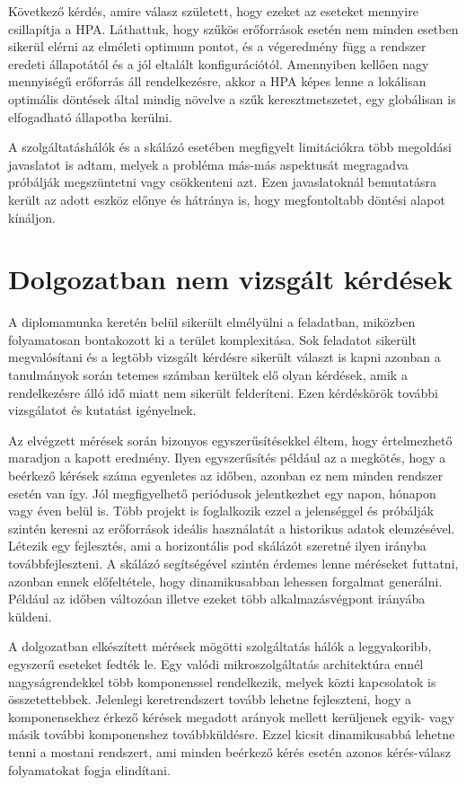 Következő kérdés, amire válasz született, hogy ezeket az eseteket mennyire csillapítja a HPA.
Láthattuk, hogy szűkös erőforrások esetén nem minden esetben sikerül elérni az elméleti optimum pontot, és a végeredmény függ a rendszer eredeti állapotától és a jól eltalált konfigurációtól.
Amennyiben kellően nagy mennyiségű erőforrás áll rendelkezésre, akkor a HPA képes lenne a lokálisan optimális döntések által mindig növelve a szűk keresztmetszetet, egy globálisan is elfogadható állapotba kerülni.

A szolgáltatáshálók és a skálázó esetében megfigyelt limitációkra több megoldási javaslatot is adtam, melyek a probléma más-más aspektusát megragadva próbálják megszüntetni vagy csökkenteni azt.
Ezen javaslatoknál bemutatásra került az adott eszköz előnye és hátránya is, hogy megfontoltabb döntési alapot kínáljon.

\section{Dolgozatban nem vizsgált kérdések}
A diplomamunka keretén belül sikerült elmélyülni a feladatban, miközben folyamatosan bontakozott ki a terület komplexitása.
Sok feladatot sikerült megvalósítani és a legtöbb vizsgált kérdésre sikerült választ is kapni azonban a tanulmányok során tetemes számban kerültek elő olyan kérdések, amik a rendelkezésre álló idő miatt nem sikerült felderíteni.
Ezen kérdéskörök további vizsgálatot és kutatást igényelnek.

Az elvégzett mérések során bizonyos egyszerűsítésekkel éltem, hogy értelmezhető maradjon a kapott eredmény.
Ilyen egyszerűsítés például az a megkötés, hogy a beérkező kérések száma egyenletes az időben, azonban ez nem minden rendszer esetén van így.
Jól megfigyelhető periódusok jelentkezhet egy napon, hónapon vagy éven belül is.
Több projekt is foglalkozik ezzel a jelenséggel és próbálják szintén keresni az erőforrások ideális használatát a historikus adatok elemzésével.
Létezik egy fejlesztés, ami a horizontális pod skálázót szeretné ilyen irányba továbbfejleszteni\citep{predictiveHPAGithub}.
A skálázó segítségével szintén érdemes lenne méréseket futtatni, azonban ennek előfeltétele, hogy dinamikusabban lehessen forgalmat generálni.
Például az időben változóan illetve ezeket több alkalmazásvégpont irányába küldeni.

A dolgozatban elkészített mérések mögötti szolgáltatás hálók a leggyakoribb, egyszerű eseteket fedték le.
Egy valódi mikroszolgáltatás architektúra ennél nagyságrendekkel több komponenssel rendelkezik, melyek közti kapcsolatok is összetettebbek.
Jelenlegi keretrendszert tovább lehetne fejleszteni, hogy a komponensekhez érkező kérések megadott arányok mellett kerüljenek egyik- vagy másik további komponenshez továbbküldésre.
Ezzel kicsit dinamikusabbá lehetne tenni a mostani rendszert, ami minden beérkező kérés esetén azonos kérés-válasz folyamatokat fogja elindítani.

